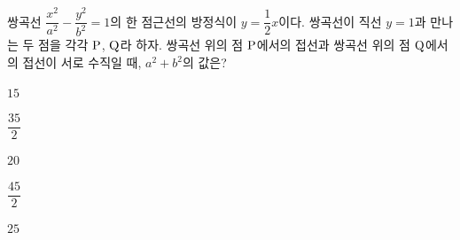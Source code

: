 쌍곡선 $\dfrac{x^2}{a^2}-\dfrac{y^2}{b^2}=1$의 한 점근선의 방정식이 $y=\dfrac{1}{2}x$이다. 쌍곡선이 직선 $y=1$과 만나는 두 점을 각각 $\mathrm{P}$, $\mathrm{Q}$라 하자. 쌍곡선 위의 점 $\mathrm{P}$에서의 접선과 쌍곡선 위의 점 $\mathrm{Q}$에서의 접선이 서로 수직일 때, $a^2+b^2$의 값은? 
\begin{choices32}{\rule[-3ex]{0pt}{8ex}$15$}{\rule[-3ex]{0pt}{8ex}$\dfrac{35}{2}$}{\rule[-3ex]{0pt}{8ex}$20$}{\rule[-3ex]{0pt}{8ex}$\dfrac{45}{2}$}{\rule[-3ex]{0pt}{8ex}$25$}\end{choices32}
